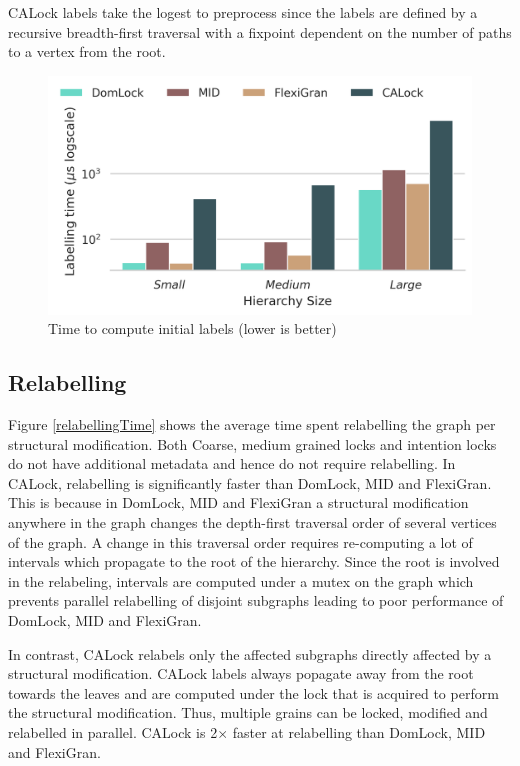 CALock labels take the logest to preprocess since the labels are defined by a recursive breadth-first traversal with a fixpoint dependent on the number of paths to a vertex from the root.

\begin{figure}
	\includegraphics[width=\columnwidth]{figures/PerformanceCharts/InitialLabelling}
	\caption{Time to compute initial labels (lower is better)}
	\label{initialLabelling}
\end{figure}


\subsection{Relabelling}
Figure \ref{relabellingTime} shows the average time spent relabelling the graph per structural modification.
Both Coarse, medium grained locks and intention locks do not have additional metadata and hence do not require relabelling. 
In CALock, relabelling is significantly faster than DomLock, MID and FlexiGran. 
This is because in DomLock, MID and FlexiGran a structural modification anywhere in the graph changes the depth-first traversal order of several vertices of the graph. 
A change in this traversal order requires re-computing a lot of intervals which propagate to the root of the hierarchy. 
Since the root is involved in the relabeling, intervals are computed under a mutex on the graph which prevents parallel relabelling of disjoint subgraphs leading to poor performance of DomLock, MID and FlexiGran.  

In contrast, CALock relabels only the affected subgraphs directly affected by a structural modification. CALock labels always popagate away from the root towards the leaves and are computed under the lock that is acquired to perform the structural modification.
Thus, multiple grains can be locked, modified and relabelled in parallel. CALock is 2$\times$ faster at relabelling than DomLock, MID and FlexiGran.

